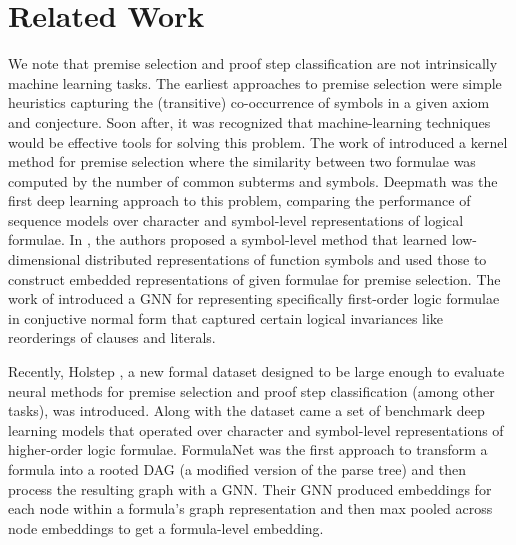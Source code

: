 \documentclass{article}
\begin{document}
 
\section{Related Work}\label{sec:related_work}




We note that premise selection and proof step classification are not intrinsically machine learning tasks. The earliest approaches to premise selection \cite{hoder2011sine} were simple heuristics capturing the (transitive) co-occurrence of symbols in a given axiom and conjecture. Soon after, it was recognized that machine-learning techniques would be effective tools for solving this problem. The work of \cite{alama2014premise} introduced a kernel method for premise selection where the similarity between two formulae was computed by the number of common subterms and symbols. Deepmath \cite{irving2016deepmath} was the first deep learning approach to this problem, comparing the performance of sequence models over character and symbol-level representations of logical formulae. In \cite{kucik2018premise}, the authors proposed a symbol-level method that learned low-dimensional distributed representations of function symbols and used those to construct embedded representations of given formulae for premise selection. The work of \cite{olvsak2019property} introduced a GNN for representing specifically first-order logic formulae in conjuctive normal form that captured certain logical invariances like reorderings of clauses and literals. 


Recently, Holstep \cite{kaliszyk2017holstep}, a new formal dataset designed to be large enough to evaluate neural methods for premise selection and proof step classification (among other tasks), was introduced.
Along with the dataset came a set of benchmark deep learning models that operated over character and symbol-level representations of higher-order logic formulae. FormulaNet \cite{wang2017premise} was the first approach to transform a formula into a rooted DAG (a modified version of the parse tree) and then process the resulting graph 
with a GNN. Their GNN produced embeddings for each node within a formula's graph representation and then max pooled across node embeddings to get a formula-level embedding.
\end{document}

